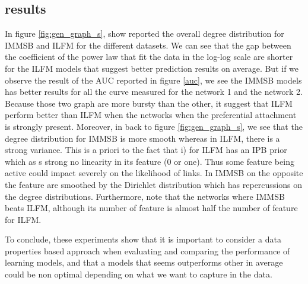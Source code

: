 \subsection{results}

In figure \ref{fig:gen_graph_s}, show reported the overall degree distribution for IMMSB and ILFM for the different datasets. We can see that the gap between the coefficient of the power law that fit the data in the log-log scale are shorter for the ILFM models that suggest better prediction results on average. But if we observe the result of the AUC reported in figure \ref{auc}, we see the IMMSB models has better results for all the curve measured for the network 1 and the network 2. Because those two graph are more bursty than the other, it suggest that ILFM perform better than ILFM when the networks when the preferential attachment is strongly present. Moreover, in back to figure \ref{fig:gen_graph_s}, we see that the degree distribution for IMMSB is more smooth whereas in ILFM, there is a strong variance. This is a priori to the fact that i) for ILFM  has an IPB prior which as s strong no linearity in its feature (0 or one). Thus some feature being active could impact severely on the likelihood of links. In IMMSB on the opposite the feature are smoothed by the Dirichlet distribution which has repercussions on the degree distributions. Furthermore, note that the networks where IMMSB beats ILFM, although its number of feature is almost half the number of feature for ILFM.

To conclude, these experiments show that it is important to consider a data properties based approach when evaluating and comparing the performance of learning models, and that a models that seems outperforms other in average could be non optimal depending on what we want to capture in the data.
